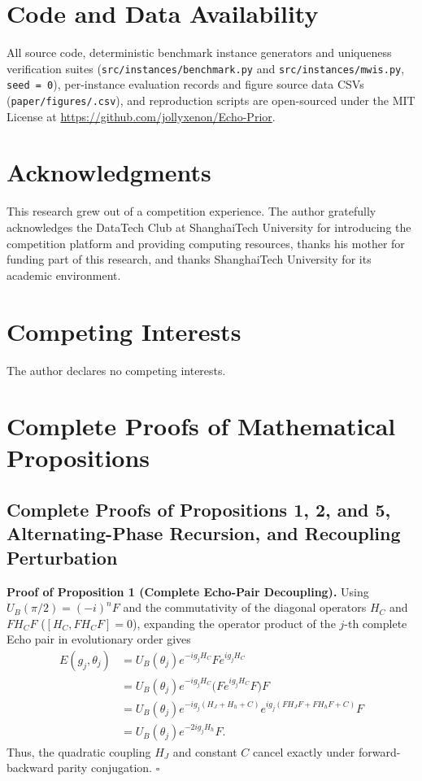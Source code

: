 \documentclass{article}
\theoremstyle{plain}
\theoremstyle{definition}
\begin{document}
\section*{Code and Data Availability}

All source code, deterministic benchmark instance generators and uniqueness verification suites (\texttt{src/\allowbreak{}instances/\allowbreak{}benchmark.py} and \texttt{src/\allowbreak{}instances/\allowbreak{}mwis.py}, \texttt{seed = 0}), per-instance evaluation records and figure source data CSVs (\texttt{paper/\allowbreak{}figures/\allowbreak{}{*}.csv}), and reproduction scripts are open-sourced under the MIT License at \url{https://github.com/jollyxenon/Echo-Prior}.

\section*{Acknowledgments}

This research grew out of a competition experience. The author gratefully acknowledges the DataTech Club at ShanghaiTech University for introducing the competition platform and providing computing resources, thanks his mother for funding part of this research, and thanks ShanghaiTech University for its academic environment.

\section*{Competing Interests}

The author declares no competing interests.




\newpage
\appendix
\onecolumn
{}
\section{Complete Proofs of Mathematical Propositions}\label{app:A}

\subsection{Complete Proofs of Propositions 1, 2, and 5, Alternating-Phase Recursion, and Recoupling Perturbation}\label{subsec:a_1}

\textbf{Proof of Proposition 1 (Complete Echo-Pair Decoupling).} Using $U_B(\pi/2)=(-i)^nF$ and the commutativity of the diagonal operators $H_C$ and $FH_CF$ ($[H_C, FH_CF]=0$), expanding the operator product of the $j$-th complete Echo pair in evolutionary order gives
\[
\begin{aligned}
E(g_j,\theta_j)
&=U_B(\theta_j)e^{-ig_jH_C}Fe^{ig_jH_C}\\
&=U_B(\theta_j)e^{-ig_jH_C}\big(Fe^{ig_jH_C}F\big)F\\
&=U_B(\theta_j)e^{-ig_j(H_J+H_h+C)}e^{ig_j(FH_JF+FH_hF+C)}F\\
&=U_B(\theta_j)e^{-2ig_jH_h}F.
\end{aligned}
\]
Thus, the quadratic coupling $H_J$ and constant $C$ cancel exactly under forward-backward parity conjugation. \hfill$\square$
\end{document}
